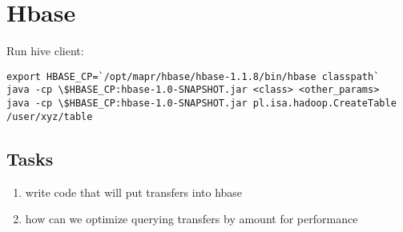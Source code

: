 \documentclass{article}
\begin{document}
\section*{Hbase}

Run hive client:
\begin{lstlisting}
export HBASE_CP=`/opt/mapr/hbase/hbase-1.1.8/bin/hbase classpath`
java -cp \$HBASE_CP:hbase-1.0-SNAPSHOT.jar <class> <other_params>
java -cp \$HBASE_CP:hbase-1.0-SNAPSHOT.jar pl.isa.hadoop.CreateTable /user/xyz/table
\end{lstlisting}

\subsection*{Tasks}

\begin{enumerate}
\item write code that will put transfers into hbase
\item how can we optimize querying transfers by amount for performance
\end{enumerate}
\end{document}
